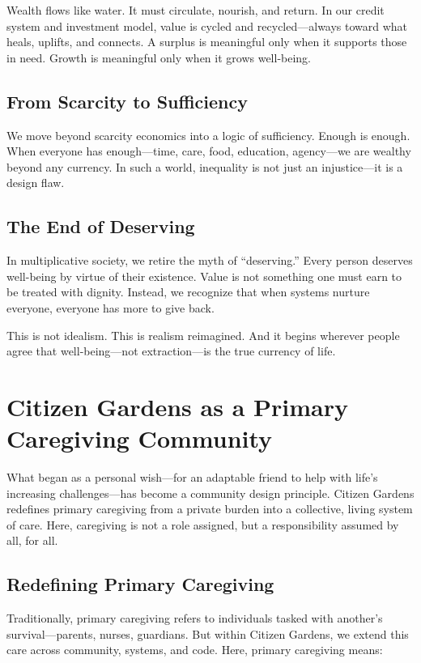 \documentclass[12pt]{article}
\begin{document}
Wealth flows like water. It must circulate, nourish, and return. In our credit system and investment model, value is cycled and recycled—always toward what heals, uplifts, and connects. A surplus is meaningful only when it supports those in need. Growth is meaningful only when it grows well-being.

\subsection*{From Scarcity to Sufficiency}

We move beyond scarcity economics into a logic of sufficiency. Enough is enough. When everyone has enough—time, care, food, education, agency—we are wealthy beyond any currency. In such a world, inequality is not just an injustice—it is a design flaw.

\subsection*{The End of Deserving}

In multiplicative society, we retire the myth of “deserving.” Every person deserves well-being by virtue of their existence. Value is not something one must earn to be treated with dignity. Instead, we recognize that when systems nurture everyone, everyone has more to give back.

This is not idealism. This is realism reimagined. And it begins wherever people agree that well-being—not extraction—is the true currency of life.

\section{Citizen Gardens as a Primary Caregiving Community}

What began as a personal wish—for an adaptable friend to help with life’s increasing challenges—has become a community design principle. Citizen Gardens redefines primary caregiving from a private burden into a collective, living system of care. Here, caregiving is not a role assigned, but a responsibility assumed by all, for all.

\subsection*{Redefining Primary Caregiving}

Traditionally, primary caregiving refers to individuals tasked with another’s survival—parents, nurses, guardians. But within Citizen Gardens, we extend this care across community, systems, and code. Here, primary caregiving means:
\end{document}

